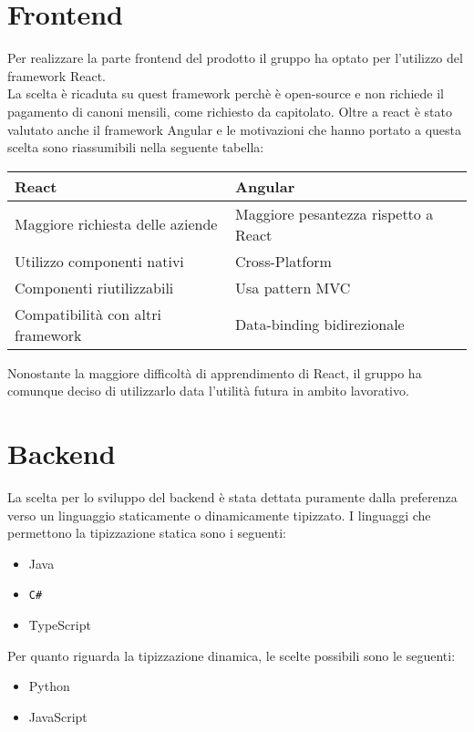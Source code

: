 \documentclass[12pt]{article}
\begin{document}
\section{Frontend}
Per realizzare la parte frontend del prodotto il gruppo ha optato per l'utilizzo del framework React. \\
La scelta è ricaduta su quest framework perchè è open-source e non richiede il pagamento di canoni mensili, come richiesto da capitolato.
Oltre a react è stato valutato anche il framework Angular e le motivazioni che hanno portato a questa scelta sono riassumibili nella seguente tabella: \\
\begin{center}
\begin{tabular}{ |p{8cm}|p{8cm}| }
	\hline
	 \textbf{React} & \textbf{Angular}\\ 
	 \hline
	 Maggiore richiesta delle aziende & Maggiore pesantezza rispetto a React \\  
	 \hline
	 Utilizzo componenti nativi & Cross-Platform \\ 
	 \hline
	 Componenti riutilizzabili & Usa pattern MVC \\
	 \hline
	 Compatibilità con altri framework & Data-binding bidirezionale \\
	\hline
\end{tabular}
\end{center}
Nonostante la maggiore difficoltà di apprendimento di React, il gruppo ha comunque deciso di utilizzarlo data l'utilità futura in ambito lavorativo.

\section{Backend}
La scelta per lo sviluppo del backend è stata dettata puramente dalla preferenza verso un linguaggio staticamente o dinamicamente tipizzato.
I linguaggi che permettono la tipizzazione statica sono i seguenti:
\begin{itemize}
	\item Java
	\item \texttt{C\#}
	\item TypeScript
\end{itemize}
Per quanto riguarda la tipizzazione dinamica, le scelte possibili sono le seguenti:
\begin{itemize}
	\item Python
	\item JavaScript
\end{itemize}
\end{document}
